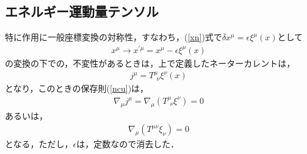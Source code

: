 \subsection{エネルギー運動量テンソル}
特に作用に一般座標変換の対称性，すなわち，(\ref{xn})式で$\overline{\delta}x^{\mu}=\epsilon\xi^{\mu}(x)$として
\begin{eqnarray}
\label{xnnn}
x^{\mu}\rightarrow x^{\prime \mu}=x^{\mu}-\epsilon\xi^{\mu}(x)
\end{eqnarray}
の変換の下での，不変性があるときは，上で定義したネーターカレントは，
\begin{eqnarray}
j^{\mu}=T^{\mu}_{\ \  \nu}\xi^{\nu}(x)
\end{eqnarray}
となり，このときの保存則(\ref{ncu})は，
\begin{eqnarray}
\nabla_{\mu}j^{\mu}=\nabla_{\mu}(T^{\mu}_{\ \  \nu}\xi^{\nu})=0
\end{eqnarray}
あるいは，
\begin{eqnarray}
\label{tmco}
\nabla_{\mu}(T^{\mu \nu}\xi_{\nu})=0
\end{eqnarray}
となる，ただし，$\epsilon$は，定数なので消去した．

